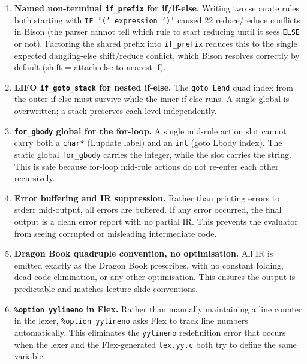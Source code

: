 \documentclass[11pt]{article}
\begin{document}
\begin{enumerate}

\item \textbf{Named non-terminal \texttt{if\_prefix} for if/if-else.}
    Writing two separate rules both starting with \texttt{IF '(' expression ')'} caused 22 reduce/reduce conflicts in Bison (the parser cannot tell which rule to start reducing until it sees \texttt{ELSE} or not). Factoring the shared prefix into \texttt{if\_prefix} reduces this to the single expected dangling-else shift/reduce conflict, which Bison resolves correctly by default (shift = attach else to nearest if).

\item \textbf{LIFO \texttt{if\_goto\_stack} for nested if-else.}
    The \texttt{goto Lend} quad index from the outer if-else must survive while the inner if-else runs. A single global is overwritten; a stack preserves each level independently.

\item \textbf{\texttt{for\_gbody} global for the for-loop.}
    A single mid-rule action slot cannot carry both a \texttt{char*} (Lupdate label) and an \texttt{int} (goto Lbody index). The static global \texttt{for\_gbody} carries the integer, while the slot carries the string. This is safe because for-loop mid-rule actions do not re-enter each other recursively.

\item \textbf{Error buffering and IR suppression.}
    Rather than printing errors to stderr mid-output, all errors are buffered. If any error occurred, the final output is a clean error report with no partial IR. This prevents the evaluator from seeing corrupted or misleading intermediate code.

\item \textbf{Dragon Book quadruple convention, no optimisation.}
    All IR is emitted exactly as the Dragon Book prescribes, with no constant folding, dead-code elimination, or any other optimisation. This ensures the output is predictable and matches lecture slide conventions.

\item \textbf{\texttt{\%option yylineno} in Flex.}
    Rather than manually maintaining a line counter in the lexer, \texttt{\%option yylineno} asks Flex to track line numbers automatically. This eliminates the \texttt{yylineno} redefinition error that occurs when the lexer and the Flex-generated \texttt{lex.yy.c} both try to define the same variable.

\end{enumerate}
\end{document}
